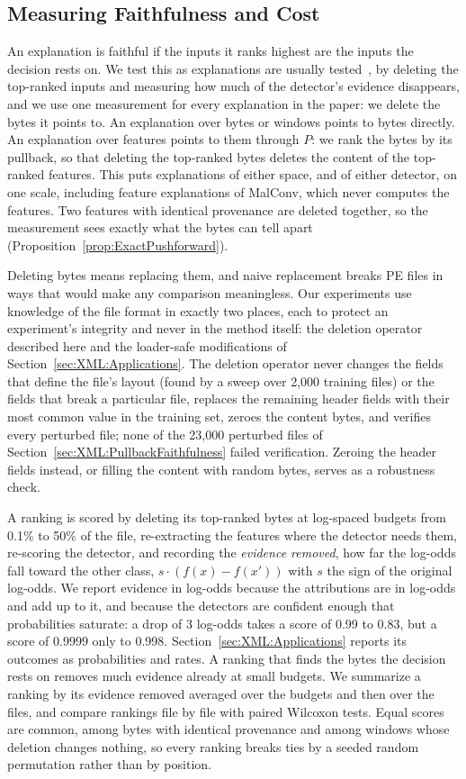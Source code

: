 \subsection{Measuring Faithfulness and Cost}
\label{sec:XML:SetupDeletion}

An explanation is faithful if the inputs it ranks highest are the inputs the decision rests on. We test this as
explanations are usually tested~\cite{petsiuk2018rise}, by deleting the top-ranked inputs and measuring how much of
the detector's evidence disappears, and we use one measurement for every explanation in the paper: we delete the
bytes it points to. An explanation over bytes or windows points to bytes directly. An explanation over features points
to them through $P$: we rank the bytes by its pullback, so that deleting the top-ranked bytes deletes the content of
the top-ranked features. This puts explanations of either space, and of either detector, on one scale, including
feature explanations of MalConv, which never computes the features. Two features with identical provenance are deleted
together, so the measurement sees exactly what the bytes can tell apart (Proposition~\ref{prop:ExactPushforward}).

Deleting bytes means replacing them, and naive replacement breaks PE files in ways that would make any comparison
meaningless. Our experiments use knowledge of the file format in exactly two places, each to protect an experiment's
integrity and never in the method itself: the deletion operator described here and the loader-safe modifications of
Section~\ref{sec:XML:Applications}. The deletion operator never changes the fields that define the file's layout
(found by a sweep over 2{,}000 training files) or the fields that break a particular file, replaces the remaining
header fields with their most common value in the training set, zeroes the content bytes, and verifies every perturbed
file; none of the 23{,}000 perturbed files of Section~\ref{sec:XML:PullbackFaithfulness} failed verification. Zeroing
the header fields instead, or filling the content with random bytes, serves as a robustness check.

A ranking is scored by deleting its top-ranked bytes at log-spaced budgets from 0.1\% to 50\% of the file,
re-extracting the features where the detector needs them, re-scoring the detector, and recording the \emph{evidence
removed}, how far the log-odds fall toward the other class, $s \cdot (f(x) - f(x'))$ with $s$ the sign of the original
log-odds. We report evidence in log-odds because the attributions are in log-odds and add up to it, and because the
detectors are confident enough that probabilities saturate: a drop of 3 log-odds takes a score of 0.99 to 0.83, but a
score of 0.9999 only to 0.998. Section~\ref{sec:XML:Applications} reports its outcomes as probabilities and rates. A
ranking that finds the bytes the decision rests on removes much evidence already at small budgets. We summarize a
ranking by its evidence removed averaged over the budgets and then over the files, and compare rankings file by file
with paired Wilcoxon tests. Equal scores are common, among bytes with identical provenance and among windows whose
deletion changes nothing, so every ranking breaks ties by a seeded random permutation rather than by position.

